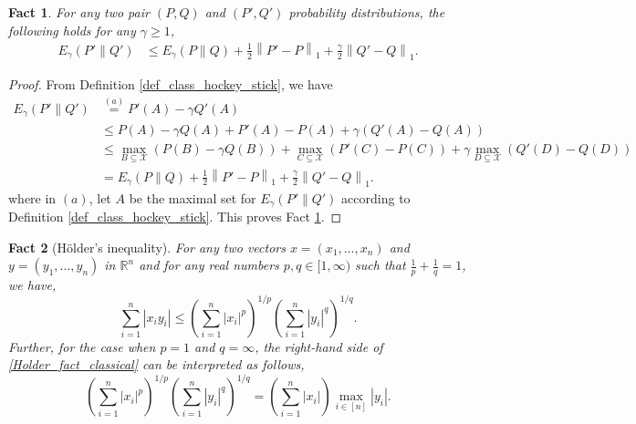 \documentclass[onecolumn,ldraftcls, 11pt]{IEEEtran}
\newtheorem{fact}{Fact}
\newcommand{\nn}{\nonumber}
\newcommand*{\cX}{\mathcal{X}}
\newcommand{\norm}[2]{{\left\lVert #1 \right\rVert}_{#2}}
\newcommand{\abs}[1]{\left\vert#1\right\vert}
\begin{document}
\begin{fact}
\label{fact_hockey_approx}
 For any two  pair  $(P,Q)$ and $(P',Q')$ probability distributions, the following holds for any $\gamma \geq 1$,
 \begin{align}
     E_{\gamma}(P'\|Q') &\leq E_{\gamma}(P\|Q) + \frac{1}{2}\norm{P'-P}{1} + \frac{\gamma}{2}\norm{Q'-Q}{1}.\label{fact_hockey_approx_eq1}
 \end{align}
\end{fact}
\begin{proof}
    From Definition \ref{def_class_hockey_stick}, we have
    \begin{align*}
        E_{\gamma}(P'\|Q') &\overset{(a)}{=}  P'(A) - \gamma Q'(A)\\
        &\leq  P(A) - \gamma Q(A) +  P'(A) - P(A) +\gamma(Q'(A) - Q(A))\\
        &\leq \max_{B \subseteq\cX}(P(B) - \gamma Q(B)) + \max_{C \subseteq\cX} (P'(C) - P(C)) +\gamma\max_{D \subseteq\cX}( Q'(D) - Q(D))\nn\\
        &=E_{\gamma}(P\|Q) +  \frac{1}{2}\norm{P'-P}{1} +\frac{\gamma}{2}\norm{Q'-Q}{1}.
    \end{align*}
    where in $(a)$, let $A$ be the maximal set for  $E_{\gamma}(P'\|Q')$ according to Definition \ref{def_class_hockey_stick}. This proves Fact \ref{fact_hockey_approx}.
\end{proof}


\begin{fact}[H\"older's inequality]\label{holder_classic}
    For any two vectors $x=(x_1, \dots, x_n)$ and $y=(y_1, \dots, y_n)$ in $\mathbb{R}^n$ and for any real numbers $p,q \in [1,\infty)$ such that $\frac{1}{p}+\frac{1}{q} = 1$, we have,
    \begin{equation}
        \sum_{i=1}^n \abs{x_i y_i} \leq \left(\sum_{i=1}^n \abs{x_i}^p\right)^{1/p}\left(\sum_{i=1}^n \abs{y_i}^q\right)^{1/q}.\label{Holder_fact_classical}
    \end{equation}
    Further, for the case when $p =1$ and $q = \infty$, the right-hand side of \eqref{Holder_fact_classical} can be interpreted as follows,
    \begin{equation}
        \left(\sum_{i=1}^n \abs{x_i}^p\right)^{1/p}\left(\sum_{i=1}^n \abs{y_i}^q\right)^{1/q} = \left(\sum_{i=1}^n \abs{x_i}\right) \max_{i \in [n]} \abs{y_i}.\label{Holder_fact_classical_p1_qinf}
    \end{equation}
\end{fact}
\end{document}
